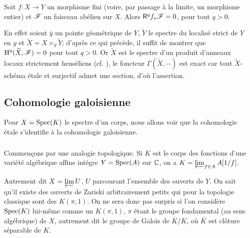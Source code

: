\documentclass[oneside]{book}
\begin{document}
\begin{proposition}\label{I:2-3-6}
Soit $f:X\to Y$ un morphisme fini (voire, par passage à la limite, un 
morphisme entier) et $\mathscr{F}$ un faisceau abélien sur $X$. Alors $\mathsf{R}^q f_* \mathscr{F}=0$, 
pour tout $q>0$.
\end{proposition}

En effet soient $\bar y$ un pointe géométrique de $Y$, $\widetilde Y$ le 
spectre du localisé strict de $Y$ en $y$ et 
$\widetilde X=X\times_Y \widetilde Y$; d'après ce qui précède, il suffit de 
montrer que $\operatorname{H}^q(\widetilde X,\mathscr{F}) = 0$ pour tout $q>0$. Or $\widetilde X$ est le 
spectre d'un produit d'anneaux locaux strictement henséliens (cf. 
\cite[I]{11}), le foncteur $\Gamma(\widetilde X,-)$ est exact car tout 
$\widetilde X$-schéma étale et surjectif admet une section, d'où l'assertion. 










\subsection{Cohomologie galoisienne}\label{I:2-4}

Pour $X=\operatorname{Spec}(K)$ le spectre d'un corps, nous allons voir que la cohomologie 
étale s'identifie à la cohomologie galoisienne. 





\subsubsection{}\label{I:2-4-1}

Commençons par une analogie topologique. Si $K$ est le corps des fonctions 
d'une variété algébrique affine intègre $Y=\operatorname{Spec}(A)$ sur $\mathbb{C}$, on a 
$K=\varprojlim_{f\in A} A[1/f]$. 

Autrement dit $X=\varprojlim U$, $U$ parcourant l'ensemble des ouverts de $Y$. 
On sait qu'il existe des ouverts de Zariski arbitrairement petits qui pour la 
topologie classique sont des $K(\pi,1)$. On ne sera donc pas surpris si l'on 
considère $\operatorname{Spec}(K)$ lui-même comme un $K(\pi,1)$, $\pi$ étant le groupe 
fondamental (au sens algébrique) de $X$, autrement dit le groupe de Galois de 
$\bar K/K$, où $\bar K$ est clôture séparable de $K$. 





\subsubsection{}\label{I:2-4-2}
\end{document}
